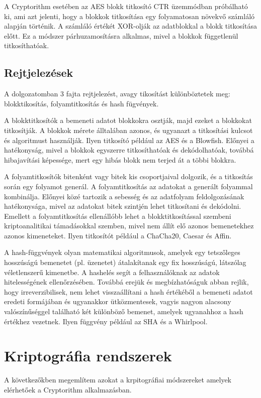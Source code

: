 A Cryptorithm esetében az AES blokk titkosító CTR üzemmódban próbálható ki, ami azt jelenti, hogy a blokkok titkosítása egy folyamatosan növekvő számláló alapján történik. A számláló értékét XOR-olják az adatblokkal a blokk titkosítása előtt. Ez a módszer párhuzamosításra alkalmas, mivel a blokkok függetlenül titkosíthatóak.

\subsection{Rejtjelezések}
A dolgozatomban 3 fajta rejtjelezést, avagy tikosítást különböztetek meg: blokktikosítás, folyamtitkosítás és hash fügvények.

A blokktitkosítók a bemeneti adatot blokkokra osztják, majd ezeket a blokkokat titkosítják. A blokkok mérete álltalában azonos, és ugyanazt a titkosítási kulcsot és algoritmust használják. Ilyen titkosító például az AES és a Blowfish. Előnyei a hatékonyság, mivel a blokkok egyszerre titkosíthatóak és dekódolhatóak, továbbá hibajavítási képessége, mert egy hibás blokk nem terjed át a többi blokkra.

A folyamtitkosítók bitenként vagy bitek kis csoportjaival dolgozik, és a titkosítás során egy folyamot generál. A folyamtitkosítás az adatokat a generált folyammal kombinálja. Előnyei közé tartozik a sebesség és az adatfolyam feldolgozásának hatékonysága, mivel az adatokat bitek szintjén lehet titkosítani és dekódolni. Emellett a folyamtitkosítás ellenállóbb lehet a blokktitkosítással szembeni kriptoanalitikai támadásokkal szemben, mivel nem állít elő azonos bemenetekhez azonos kimeneteket. Ilyen titkosítót például a ChaCha20, Caesar és Affin.

A hash-függvények olyan matematikai algoritmusok, amelyek egy tetszőleges hosszúságú bemenetet (pl. üzenetet) átalakítanak egy fix hosszúságú, látszólag véletlenszerű kimenetbe. A hashelés segít a felhasználóknak az adatok hitelességének ellenőrzésében. Továbbá erejük és megbízhatóságuk abban rejlik, hogy irreverzibilisek, nem lehet visszaállítani a hash értékéből a bemeneti adatot eredeti formájában és ugyanakkor ütközmentesek, vagyis nagyon alacsony valószínűséggel található két különböző bemenet, amelyek ugyanahhoz a hash értékhez vezetnek. Ilyen függvény például az SHA és a Whirlpool.

\pagebreak
\section{Kriptográfia rendszerek}
A következőkben megemlítem azokat a krpitográfiai módszereket amelyek elérhetőek a Cryptorithm alkalmazásban.


